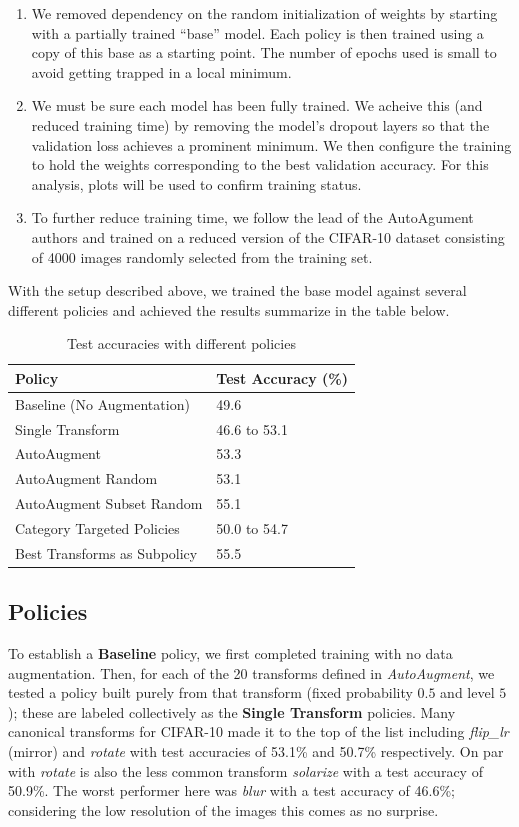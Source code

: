 \documentclass[10pt,twocolumn,letterpaper]{article}
\begin{document}
    \begin{enumerate}
      \item 
        We removed dependency on the random initialization of weights by starting with a partially trained ``base'' model. Each policy is then trained using a copy of this base as a starting point. The number of epochs used is small to avoid getting trapped in a local minimum.
      \item 
        We must be sure each model has been fully trained. We acheive this (and reduced training time) by removing the model's dropout layers so that the validation loss achieves a prominent minimum. We then configure the training to hold the weights corresponding to the best validation accuracy. For this analysis, plots will be used to confirm training status.
      \item 
        To further reduce training time, we follow the lead of the AutoAgument authors and trained on a reduced version of the CIFAR-10 dataset consisting of 4000 images randomly selected from the training set.
    \end{enumerate}

    With the setup described above, we trained the base model against several different policies and achieved the results summarize in the table below.

    \begin{table}[h]
    \begin{tabular}{l|l}
    \hline
    Policy  			&Test Accuracy (\%)   \\ \hline
    Baseline (No Augmentation)  	&49.6 \\
    Single Transform		&46.6 to 53.1 \\
    AutoAugment 			&53.3 \\ 
    AutoAugment Random		&53.1 \\	
    AutoAugment Subset Random 	&55.1 \\
    Category Targeted Policies   	&50.0 to 54.7 \\
    Best Transforms as Subpolicy 	&55.5 \\
    \hline
    \end{tabular}
    \caption{Test accuracies with different policies}
    \end{table}

  \subsection{Policies}
    \label{sec:policies}
    To establish a \textbf{Baseline} policy, we first completed training with no data augmentation. Then, for each of the 20 transforms defined in \textit{AutoAugment}, we tested a policy built purely from that transform (fixed probability $0.5$ and level $5$); these are labeled collectively as the \textbf{Single Transform} policies. Many canonical transforms for CIFAR-10 made it to the top of the list including \textit{flip\_lr} (mirror) and \textit{rotate} with test accuracies of 53.1\% and 50.7\% respectively. On par with \textit{rotate} is also the less common transform \textit{solarize} with a test accuracy of 50.9\%. The worst performer here was \textit{blur} with a test accuracy of 46.6\%; considering the low resolution of the images this comes as no surprise.
\end{document}
